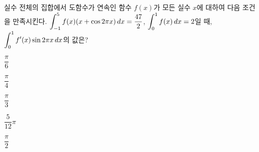 \hspace*{2mm}\begin{minipage}[t]{\dimexpr\linewidth-2mm\relax}\vspace{0pt}
실수 전체의 집합에서 도함수가 연속인 함수 $f(x)$가 모든 실수 $x$에 대하여 다음 조건을 만족시킨다.  $\displaystyle\int_{-1}^{5}f(x)(x+\cos 2\pi x)\mkern3mu dx=\dfrac{47}{2}$, $\displaystyle\int_{0}^{1}f(x)\mkern3mu dx=2$일 때, $\displaystyle\int_{0}^{1}f'(x)\sin 2\pi x\mkern3mu dx$의 값은?
\begin{choices32}{\rule[-3ex]{0pt}{8ex}$\dfrac{\pi}{6}$}{\rule[-3ex]{0pt}{8ex}$\dfrac{\pi}{4}$}{\rule[-3ex]{0pt}{8ex}$\dfrac{\pi}{3}$}{\rule[-3ex]{0pt}{8ex}$\dfrac{5}{12}\pi$}{\rule[-3ex]{0pt}{8ex}$\dfrac{\pi}{2}$}\end{choices32}\end{minipage}
